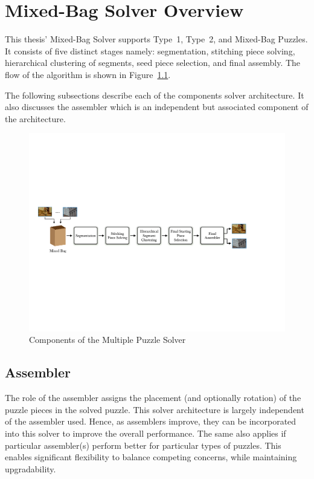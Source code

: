 \chapter{Mixed-Bag Solver Overview}

This thesis' Mixed-Bag Solver supports Type~1, Type~2, and Mixed-Bag Puzzles.  It consists of five distinct stages namely: segmentation, stitching piece solving, hierarchical clustering of segments, seed piece selection, and final assembly.  The flow of the algorithm is shown in Figure~\ref{fig:multipuzzleSolverArchitecture}.

The following subsections describe each of the components solver architecture.  It also discusses the assembler which is an independent but associated component of the architecture.

\begin{figure}[ht!]
	\centering
		\includegraphics[width=1.0\textwidth]{images/cropped_algorithm_structure_overview.pdf}
	\caption{Components of the Multiple Puzzle Solver}\label{fig:multipuzzleSolverArchitecture}
\end{figure}

\section{Assembler}\label{sec:SolverAssembler}

The role of the assembler assigns the placement (and optionally rotation) of the puzzle pieces in the solved puzzle.  This solver architecture is largely independent of the assembler used.  Hence, as assemblers improve, they can be incorporated into this solver to improve the overall performance.  The same also applies if particular assembler(s) perform better for particular types of puzzles.  This enables significant flexibility to balance competing concerns, while maintaining upgradability.

